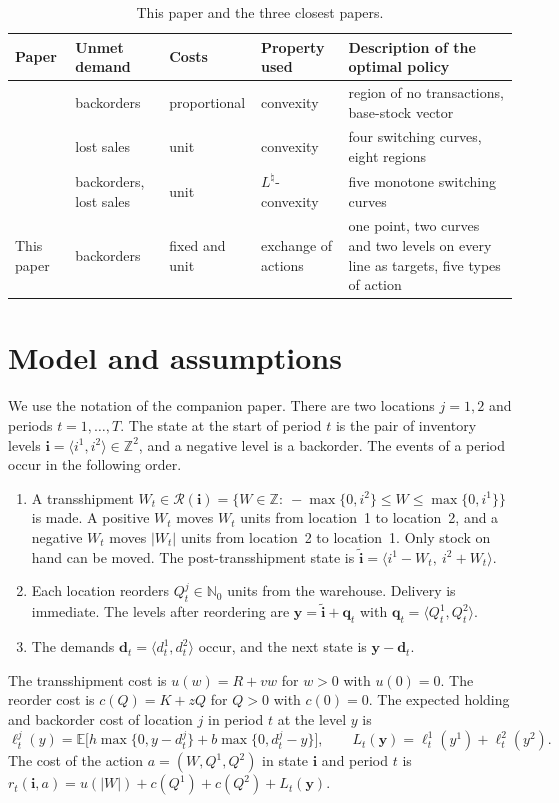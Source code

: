 \documentclass[11pt]{article}
\renewcommand{\vec}[1]{\boldsymbol{#1}}
\newcommand{\E}{\mathbb{E}}
\newcommand{\Z}{\mathbb{Z}}
\newcommand{\N}{\mathbb{N}_0}
\newcommand{\R}{\mathcal{R}}
\theoremstyle{definition}
\begin{document}
\begin{table}[h]
\centering
\small
\caption{This paper and the three closest papers.}\label{tab:position}
\begin{tabular}{p{2.9cm}p{1.9cm}p{2.0cm}p{2.4cm}p{4.3cm}}
\toprule
Paper & Unmet demand & Costs & Property used & Description of the optimal policy \\
\midrule
\citet{karmarkar1981multiperiod} & backorders & proportional & convexity & region of no transactions, base-stock vector \\
\citet{abouee2015optimal} & lost sales & unit & convexity & four switching curves, eight regions \\
\citet{xu2023optimal} & backorders, lost sales & unit & $L^{\natural}$-convexity & five monotone switching curves \\
This paper & backorders & fixed and unit & exchange of actions & one point, two curves and two levels on every line as targets, five types of action \\
\bottomrule
\end{tabular}
\end{table}

\section{Model and assumptions}\label{sec:model}

We use the notation of the companion paper. There are two locations $j=1,2$ and periods $t=1,\ldots,T$. The state at the start of period $t$ is the pair of inventory levels $\vec{i}=\langle i^1,i^2\rangle\in\Z^2$, and a negative level is a backorder. The events of a period occur in the following order.
\begin{enumerate}
\item A transshipment $W_t\in\R(\vec{i})=\{W\in\Z:\ -\max\{0,i^2\}\le W\le \max\{0,i^1\}\}$ is made. A positive $W_t$ moves $W_t$ units from location~1 to location~2, and a negative $W_t$ moves $|W_t|$ units from location~2 to location~1. Only stock on hand can be moved. The post-transshipment state is $\tilde{\vec{i}}=\langle i^1-W_t,\ i^2+W_t\rangle$.
\item Each location reorders $Q^j_t\in\N$ units from the warehouse. Delivery is immediate. The levels after reordering are $\vec{y}=\tilde{\vec{i}}+\vec{q}_t$ with $\vec{q}_t=\langle Q^1_t,Q^2_t\rangle$.
\item The demands $\vec{d}_t=\langle d^1_t,d^2_t\rangle$ occur, and the next state is $\vec{y}-\vec{d}_t$.
\end{enumerate}
The transshipment cost is $u(w)=R+vw$ for $w>0$ with $u(0)=0$. The reorder cost is $c(Q)=K+zQ$ for $Q>0$ with $c(0)=0$. The expected holding and backorder cost of location $j$ in period $t$ at the level $y$ is
\[
\ell^j_t(y)=\E\big[h\max\{0,y-d^j_t\}+b\max\{0,d^j_t-y\}\big],
\qquad L_t(\vec{y})=\ell^1_t(y^1)+\ell^2_t(y^2).
\]
The cost of the action $a=(W,Q^1,Q^2)$ in state $\vec{i}$ and period $t$ is $r_t(\vec{i},a)=u(|W|)+c(Q^1)+c(Q^2)+L_t(\vec{y})$.
\end{document}
